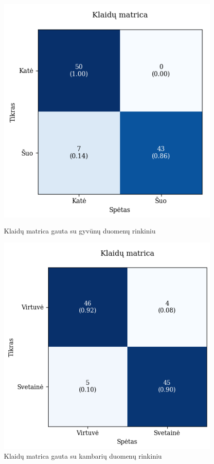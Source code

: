 \documentclass{VUMIFPSbakalaurinis}
\begin{document}
\begin{figure}[!htbp]
    \centering
    \begin{minipage}[b]{0.48\textwidth}
      \includegraphics[width=\textwidth]{img/GrapthsNEW/Large/animal/10/KM_DC_L_10.png}
      \caption{Klaidų matrica gauta su gyvūnų duomenų rinkiniu}
    \end{minipage}
    \hspace{2mm}
    \begin{minipage}[b]{0.48\textwidth}
      \includegraphics[width=\textwidth]{img/GrapthsNEW/Large/room/10/KM_R_L_10.png}
      \caption{Klaidų matrica gauta su kambarių duomenų rinkiniu}
    \end{minipage}
\end{figure}
\end{document}
